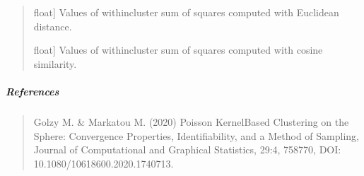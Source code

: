 \documentclass[letterpaper,10pt,english,openany,oneside]{sphinxmanual}
\begin{document}
{{{{\begin{fulllineitems}
\begin{quote}
\begin{description}
\sphinxlineitem{euclidean\_wcss\_}{[}float{]}
\sphinxAtStartPar
Values of within\sphinxhyphen{}cluster sum of squares computed with
Euclidean distance.

\sphinxlineitem{cosine\_wcss\_}{[}float{]}
\sphinxAtStartPar
Values of within\sphinxhyphen{}cluster sum of squares computed with
cosine similarity.

\end{description}
\end{quote}


\subparagraph{References}
\label{\detokenize{api_reference/generated/QuadratiK.spherical_clustering.PKBC:references}}\begin{quote}

\sphinxAtStartPar
Golzy M. \& Markatou M. (2020) Poisson Kernel\sphinxhyphen{}Based
Clustering on the Sphere: Convergence Properties, Identifiability,
and a Method of Sampling, Journal of Computational and Graphical Statistics,
29:4, 758\sphinxhyphen{}770, DOI: 10.1080/10618600.2020.1740713.
\end{quote}



\end{fulllineitems}}}}}
\end{document}
